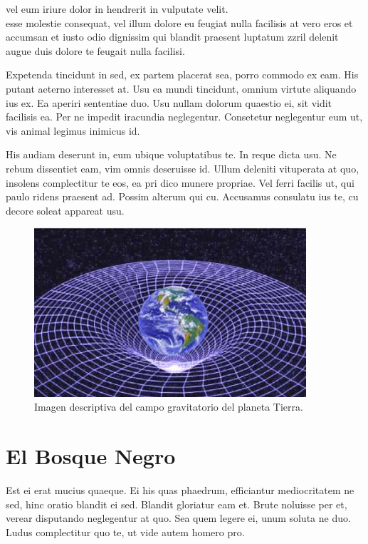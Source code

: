 \documentclass[a4paper, 11pt, titlepage, twocolumn]{book}
\begin{document}
vel eum iriure dolor in hendrerit in vulputate velit. \\ esse molestie 
consequat, vel illum dolore eu feugiat nulla facilisis at vero eros 
et accumsan et iusto odio dignissim qui blandit praesent luptatum 
zzril delenit augue duis dolore te feugait nulla facilisi.

Expetenda tincidunt in sed, ex partem placerat sea, porro commodo ex eam. His putant aeterno interesset at. Usu ea mundi tincidunt, omnium virtute aliquando ius ex. Ea aperiri sententiae duo. Usu nullam dolorum quaestio ei, sit vidit facilisis ea. Per ne impedit iracundia neglegentur. Consetetur neglegentur eum ut, vis animal legimus inimicus id.

His audiam deserunt in, eum ubique voluptatibus te. In reque dicta usu. Ne rebum dissentiet eam, vim omnis deseruisse id. Ullum deleniti vituperata at quo, insolens complectitur te eos, ea pri dico munere propriae. Vel ferri facilis ut, qui paulo ridens praesent ad. Possim alterum qui cu. Accusamus consulatu ius te, cu decore soleat appareat usu.

\begin{figure}[htp]
    \centering
    \includegraphics[width=0.9\textwidth]{imagen.jpeg}
    \caption{Imagen descriptiva del campo gravitatorio del planeta Tierra.}
    \label{}
\end{figure}

\section{El Bosque Negro}

Est ei erat mucius quaeque. Ei his quas phaedrum, efficiantur mediocritatem ne sed, hinc oratio blandit ei sed. Blandit gloriatur eam et. Brute noluisse per et, verear disputando neglegentur at quo. Sea quem legere ei, unum soluta ne duo. Ludus complectitur quo te, ut vide autem homero pro.
\end{document}
